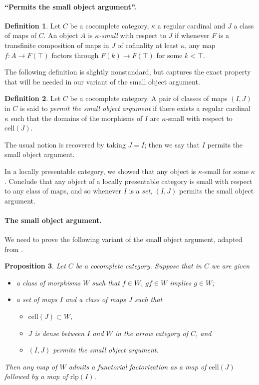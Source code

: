 \documentclass{article}
\theoremstyle{definition}
\newtheorem{definition}{Definition}[section]
\theoremstyle{plain}
\newtheorem{prop}[definition]{Proposition}
\newcommand{\cell}{\mathrm{cell}}
\newcommand{\rlp}{\mathrm{rlp}}
\begin{document}
\paragraph{``Permits the small object argument''.}

\begin{definition}
  Let $C$ be a cocomplete category, $\kappa$ a regular cardinal and $J$ a class of maps of $C$.
  An object $A$ is \emph{$\kappa$-small} with respect to $J$ if whenever $F$ is a transfinite composition of maps in $J$ of cofinality at least $\kappa$, any map $f : A \to F(\top)$ factors through $F(k) \to F(\top)$ for some $k < \top$.
\end{definition}

The following definition is slightly nonstandard, but captures the exact property that will be needed in our variant of the small object argument.

\begin{definition}
  Let $C$ be a cocomplete category.
  A pair of classes of maps $(I, J)$ in $C$ is said to \emph{permit the small object argument} if there exists a regular cardinal $\kappa$ such that the domains of the morphisms of $I$ are $\kappa$-small with respect to $\cell(J)$.
\end{definition}

The usual notion is recovered by taking $J = I$; then we say that $I$ permits the small object argument.

In a locally presentable category, we showed that any object is $\kappa$-small for some $\kappa$.
Conclude that any object of a locally presentable category is small with respect to any class of maps, and so whenever $I$ is a \emph{set}, $(I, J)$ permits the small object argument.

\paragraph{The small object argument.}
We need to prove the following variant of the small object argument, adapted from \cite{B}.

\begin{prop}
  Let $C$ be a cocomplete category.
  Suppose that in $C$ we are given
  \begin{itemize}
  \item a class of morphisms $W$ such that $f \in W$, $gf \in W$ implies $g \in W$;
  \item a \emph{set} of maps $I$ and a class of maps $J$ such that
    \begin{itemize}
    \item $\cell(J) \subset W$,
    \item $J$ is dense between $I$ and $W$ in the arrow category of $C$, and
    \item $(I, J)$ permits the small object argument.
    \end{itemize}
  \end{itemize}
  Then any map of $W$ admits a functorial factorization as a map of $\cell(J)$ followed by a map of $\rlp(I)$.
\end{prop}
\end{document}
